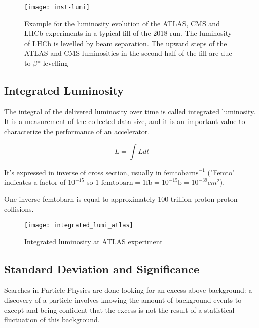 \begin{figure}
	\centerline{
		\texttt{[image: inst-lumi]}}
	\caption{Example for the luminosity evolution of the ATLAS, CMS and LHCb experiments in a typical fill of the 2018 run. The luminosity of LHCb is levelled by beam separation. The upward steps of the ATLAS and CMS luminosities in the second half of the fill are due to $\beta\text{*}$ levelling
		\cite{Wenninger:2018cgs}}
	\label{fig:lum_evolution}
\end{figure}


\subsection{Integrated Luminosity}

The integral of the delivered luminosity over time is called integrated luminosity. It is a measurement of the collected data size, and it is an important value to characterize the performance of an accelerator.

\begin{equation}
	L = \int Ldt
\end{equation}

It's expressed in inverse of cross section, usually in $\text{femtobarns}^{-1}$ ("Femto" indicates a factor of $10^{-15}$ so $\text{1 femtobarn} = 1 \text{fb} = 10^{-15} \text{b} = 10^{-39} cm^2 $).

One inverse femtobarn is equal to approximately 100 trillion proton-proton collisions.

\begin{figure}
	\centerline{
		\texttt{[image: integrated\_lumi\_atlas]}}
	\caption{Integrated luminosity at ATLAS experiment \cite{Bruce:2016iew}}
\end{figure}

\subsection{Standard Deviation and Significance}

Searches in Particle Physics are done looking for an excess above background: a discovery of a particle involves knowing the amount of background events to except and being confident that the excess is not the result of a statistical fluctuation of this background.


